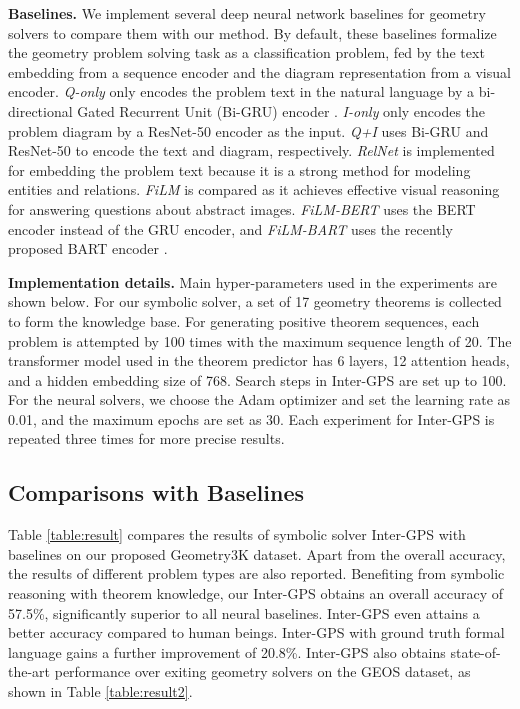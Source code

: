 \documentclass[11pt,a4paper]{article}
\newcommand{\xd}[1]{{\color{blue}{[#1]}}}
\begin{document}
\noindent\textbf{Baselines.} We implement several deep neural network baselines for geometry solvers to compare them with our method. By default, these baselines formalize the geometry problem solving task as a classification problem, fed by the text embedding from a sequence encoder and the diagram representation from a visual encoder. 
\textit{Q-only} only encodes the problem text in the natural language by a bi-directional Gated Recurrent Unit (Bi-GRU) encoder \citep{Cho2014OnTP}.
\textit{I-only} only encodes the problem diagram by a ResNet-50 encoder \citep{he2016deep} as the input. 
\textit{Q+I} uses Bi-GRU and ResNet-50 to encode the text and diagram, respectively.
\textit{RelNet} \cite{bansal2017relnet} is implemented for embedding the problem text because it is a strong method for modeling entities and relations.
\textit{FiLM} \cite{perez2018film} is compared as it achieves effective visual reasoning for answering questions about abstract images.
\textit{FiLM-BERT}  uses the BERT encoder \cite{devlin2018bert} instead of the GRU encoder, and \textit{FiLM-BART} uses the recently proposed  BART encoder \cite{lewis2020bart}.

\noindent\textbf{Implementation details.} Main hyper-parameters used in the experiments are shown below. For our symbolic solver, a set of 17 geometry theorems is collected to form the knowledge base. For generating positive theorem sequences, each problem is attempted by 100 times with the maximum sequence length of 20. The transformer model used in the theorem predictor has 6 layers, 12 attention heads, and a hidden embedding size of 768. Search steps in Inter-GPS are set up to 100. For the neural solvers, we choose the Adam optimizer and set the learning rate as 0.01, and the maximum epochs are set as 30. Each experiment for Inter-GPS is repeated three times for more precise results.

\subsection{Comparisons with Baselines}

Table \ref{table:result} compares the results of symbolic solver Inter-GPS with baselines on our proposed Geometry3K dataset. Apart from the overall accuracy, the results of different problem types are also reported. Benefiting from symbolic reasoning with theorem knowledge, our Inter-GPS obtains an overall accuracy of 57.5\%, significantly superior to all neural baselines. Inter-GPS even attains a better accuracy compared to human beings. Inter-GPS with ground truth formal language gains a further improvement of 20.8\%. Inter-GPS also obtains state-of-the-art performance over exiting geometry solvers on the GEOS dataset, as shown in Table \ref{table:result2}.
\end{document}
